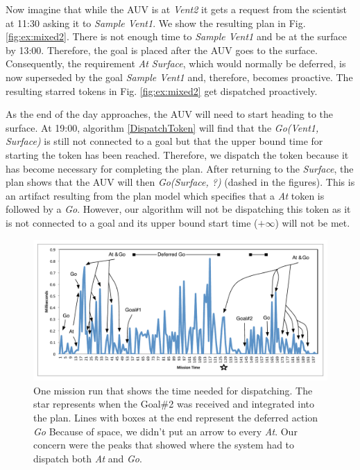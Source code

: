 Now imagine that while the AUV is at {\em Vent2} it gets a request
from the scientist at 11:30 asking it to {\em Sample Vent1}. We show
the resulting plan in Fig. \ref{fig:ex:mixed2}. There is not enough
time to {\em Sample Vent1} and be at the surface by 13:00. Therefore,
the goal is placed after the AUV goes to the surface.  Consequently,
the requirement {\em At Surface}, which would normally be deferred, is
now superseded by the goal {\em Sample Vent1} and, therefore,
becomes proactive. The resulting starred tokens in
Fig. \ref{fig:ex:mixed2} get dispatched proactively.

As the end of the day approaches, the AUV will need to start heading
to the surface. At 19:00, algorithm \ref{DispatchToken} will find that
the {\em Go(Vent1, Surface)} is still not connected to a goal but that
the upper bound time for starting the token has been
reached. Therefore, we dispatch the token because it has become
necessary for completing the plan.  After returning to the {\em
  Surface}, the plan shows that the AUV will then {\em Go(Surface, ?)}
(dashed in the figures). This is an artifact resulting from the plan
model which specifies that a {\em At} token is followed by a {\em Go}.
However, our algorithm will not be dispatching this token as it is not
connected to a goal and its upper bound start time ($+\infty$) will
not be met.

\begin{figure}[!htbp]
  \centering
  \includegraphics[width=\columnwidth]{figs/example_run.pdf}
  \caption{\small One mission run that shows the time needed for
    dispatching. The star represents when the Goal\#2 was received and
    integrated into the plan. Lines with boxes at the end represent
    the deferred action {\em Go} Because of space, we didn't put an
    arrow to every {\em At}. Our concern were the peaks that showed
    where the system had to dispatch both {\em At} and {\em Go}. }
  \label{fig:example_run}
\end{figure}

